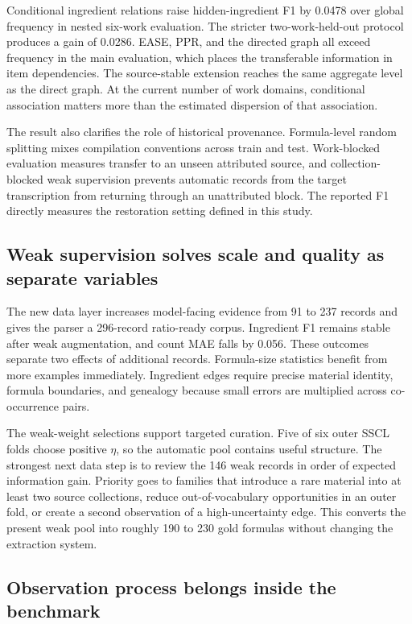 \documentclass[11pt,a4paper]{article}
\newcommand{\SSCL}{\textsc{SSCL}}
\begin{document}
Conditional ingredient relations raise hidden-ingredient F1 by 0.0478 over global frequency in nested six-work evaluation. The stricter two-work-held-out protocol produces a gain of 0.0286. EASE, PPR, and the directed graph all exceed frequency in the main evaluation, which places the transferable information in item dependencies. The source-stable extension reaches the same aggregate level as the direct graph. At the current number of work domains, conditional association matters more than the estimated dispersion of that association.

The result also clarifies the role of historical provenance. Formula-level random splitting mixes compilation conventions across train and test. Work-blocked evaluation measures transfer to an unseen attributed source, and collection-blocked weak supervision prevents automatic records from the target transcription from returning through an unattributed block. The reported F1 directly measures the restoration setting defined in this study.

\subsection{Weak supervision solves scale and quality as separate variables}

The new data layer increases model-facing evidence from 91 to 237 records and gives the parser a 296-record ratio-ready corpus. Ingredient F1 remains stable after weak augmentation, and count MAE falls by 0.056. These outcomes separate two effects of additional records. Formula-size statistics benefit from more examples immediately. Ingredient edges require precise material identity, formula boundaries, and genealogy because small errors are multiplied across co-occurrence pairs.

The weak-weight selections support targeted curation. Five of six outer \SSCL{} folds choose positive $\eta$, so the automatic pool contains useful structure. The strongest next data step is to review the 146 weak records in order of expected information gain. Priority goes to families that introduce a rare material into at least two source collections, reduce out-of-vocabulary opportunities in an outer fold, or create a second observation of a high-uncertainty edge. This converts the present weak pool into roughly 190 to 230 gold formulas without changing the extraction system.

\subsection{Observation process belongs inside the benchmark}
\end{document}
